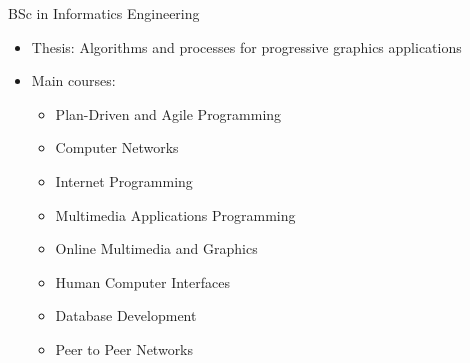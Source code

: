 \documentclass[a4paper,12pt]{memoir} %
\begin{document}
\userinformation %

\framebreak %









 {BSc in Informatics Engineering}
\begin{itemize}
\item Thesis: \small Algorithms and processes for progressive graphics applications
\item Main courses:
		\begin{itemize}
			\item \small Plan-Driven and Agile Programming
			\item \small Computer Networks
			\item \small Internet Programming
			\item \small Multimedia Applications Programming
			\item \small Online Multimedia and Graphics
			\item \small Human Computer Interfaces
			\item \small Database Development
			\item \small Peer to Peer Networks
		\end{itemize}
\end{itemize}
\end{document}
